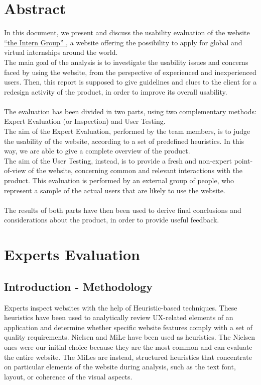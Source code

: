 \documentclass[11pt, letterpaper]{article}
\begin{document}
\cleardoublepage

\fancyhead{}
\fancyfoot{}
\fancyhead[C]{}
\cfoot{\thepage}

\tableofcontents
\cleardoublepage

\section{Abstract}

In this document, we present and discuss the usability evaluation of the website \href{https://www.theinterngroup.com/}{“the Intern Group” }, a website offering the possibility to apply for global and virtual internships around the world. \\
The main goal of the analysis is to investigate the usability issues and concerns faced by using the website, from the perspective of experienced and inexperienced users. Then, this report is supposed to give guidelines and clues to the client for a redesign activity of the product, in order to improve its overall usability.  
\\ \\
The evaluation has been divided in two parts, using two complementary methods: Expert Evaluation (or Inspection) and User Testing. 
\\
The aim of the Expert Evaluation, performed by the team members, is to judge the usability of the website, according to a set of predefined heuristics. In this way, we are able to give a complete overview of the product. 
\\
The aim of the User Testing, instead, is to provide a fresh and non-expert point-of-view of the website, concerning common and relevant interactions with the product. This evaluation is performed by an external group of people, who represent a sample of the actual users that are likely to use the website. 
\\ \\
The results of both parts have then been used to derive final conclusions and considerations about the product, in order to provide useful feedback. 


\section{Experts Evaluation}
\subsection{Introduction - Methodology}
 Experts inspect websites with the help of Heuristic-based techniques.
These heuristics have been used to analytically review UX-related elements of an application and determine whether specific website features comply with a set of quality requirements.
Nielsen and MiLe have been used as heuristics.
The Nielsen ones were our initial choice because they are the most common and can evaluate the entire website.
The MiLes are instead, structured heuristics that concentrate on particular elements of the website during analysis, such as the text font, layout, or coherence of the visual aspects. 
\end{document}
